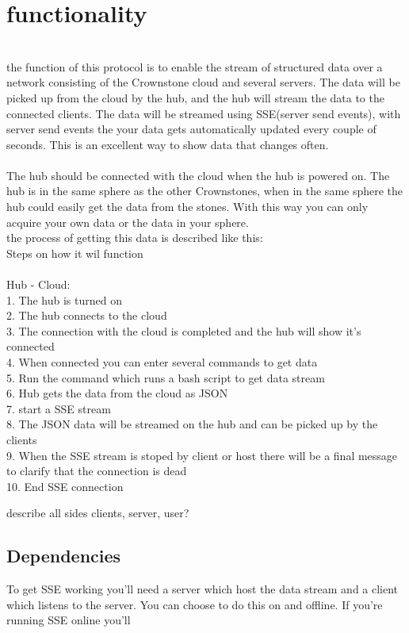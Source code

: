 \documentclass{article}
\begin{document}
\section{functionality} 
 \\
the function of this protocol is to enable the stream of structured data over a network consisting of the Crownstone cloud and several servers. The data will be picked up from the cloud by the hub, and the hub will stream the data to the connected clients. The data will be streamed using SSE(server send events), with server send events the your data gets automatically updated  every couple of seconds. This is an excellent way to show data that changes often.\\
\\
The hub should be connected with the cloud when the hub is powered on. The hub is in the same sphere as  the other Crownstones, when in the same sphere the hub could easily get the data from the stones. With this way you can only acquire your own data or the data in your sphere.  
\\
the process of getting this data is described like this:\\
Steps on how it wil function \\
\\
Hub  - Cloud: \\
1. The hub is turned on\\
2. The hub connects to the cloud\\
3. The connection with the cloud is completed and the hub will show it's connected\\
4. When connected you can enter several commands to get data\\
5. Run the command which runs a bash script to get data stream\\
6. Hub gets the data from the cloud as JSON\\
7. start a SSE stream \\
8. The JSON data will be streamed on the hub and can be picked up by the clients\\
9. When the SSE stream is stoped by client or host there will be a final message to clarify that the connection is dead\\
10. End SSE connection 


describe all sides clients, server, user? 
\subsection{Dependencies}\label{dependencies}
To get SSE working you'll need a server which host the data stream and a client which listens to the server. You can choose to do this on and offline. If you're running SSE online you'll 
\end{document}
